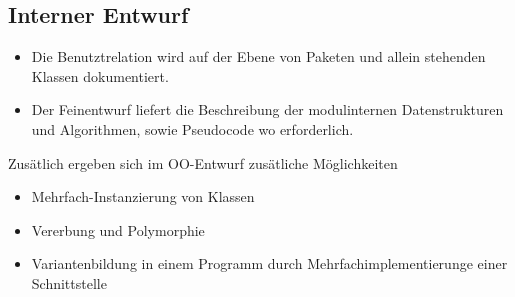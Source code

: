 \subsection{Interner Entwurf}
\begin{itemize}
    \item Die Benutztrelation wird auf der Ebene von Paketen und allein stehenden Klassen dokumentiert.
    \item Der Feinentwurf liefert die Beschreibung der modulinternen Datenstrukturen und Algorithmen, sowie Pseudocode wo erforderlich.
\end{itemize}

Zusätlich ergeben sich im OO-Entwurf zusätliche Möglichkeiten
\begin{itemize}
    \item Mehrfach-Instanzierung von Klassen
    \item Vererbung und Polymorphie
    \item Variantenbildung in einem Programm durch Mehrfachimplementierunge einer Schnittstelle
\end{itemize}